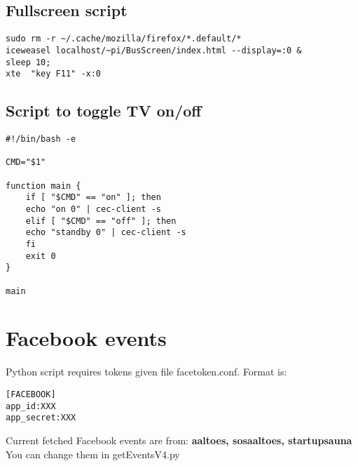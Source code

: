 \documentclass{article}
\begin{document}
\subsection{Fullscreen script}
\begin{verbatim}
sudo rm -r ~/.cache/mozilla/firefox/*.default/*
iceweasel localhost/~pi/BusScreen/index.html --display=:0 &
sleep 10;
xte  "key F11" -x:0
\end{verbatim}
\subsection{Script to toggle TV on/off}
\begin{verbatim}
#!/bin/bash -e

CMD="$1"

function main {
    if [ "$CMD" == "on" ]; then
	echo "on 0" | cec-client -s 
    elif [ "$CMD" == "off" ]; then
	echo "standby 0" | cec-client -s
    fi
    exit 0
}

main
\end{verbatim}
\section{Facebook events}
Python script requires tokens given file facetoken.conf. Format is:
\begin{verbatim}
[FACEBOOK]
app_id:XXX
app_secret:XXX
\end{verbatim}
Current fetched Facebook events are from: \textbf{aaltoes, sosaaltoes, startupsauna}
You can change them in getEventsV4.py
\end{document}
